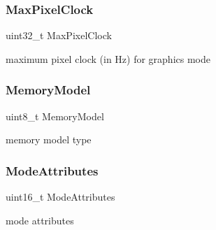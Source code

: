 \hypertarget{structvbe__mode__info__t_ab1fbd72846963ebb34a308a7edf7bbe1}{}\label{structvbe__mode__info__t_ab1fbd72846963ebb34a308a7edf7bbe1} 
\subsubsection{\texorpdfstring{Max\+Pixel\+Clock}{MaxPixelClock}}
{\footnotesize\ttfamily uint32\+\_\+t Max\+Pixel\+Clock}



maximum pixel clock (in Hz) for graphics mode 

\hypertarget{structvbe__mode__info__t_ab9be703b2b515ba3428ed97af9bb084d}{}\label{structvbe__mode__info__t_ab9be703b2b515ba3428ed97af9bb084d} 
\subsubsection{\texorpdfstring{Memory\+Model}{MemoryModel}}
{\footnotesize\ttfamily uint8\+\_\+t Memory\+Model}



memory model type 

\hypertarget{structvbe__mode__info__t_ad7593abf9d201ce5e59de60baba548cd}{}\label{structvbe__mode__info__t_ad7593abf9d201ce5e59de60baba548cd} 
\subsubsection{\texorpdfstring{Mode\+Attributes}{ModeAttributes}}
{\footnotesize\ttfamily uint16\+\_\+t Mode\+Attributes}



mode attributes 

\hypertarget{structvbe__mode__info__t_aa955c03441b6d3e55b2ba4be4dae56a2}{}\label{structvbe__mode__info__t_aa955c03441b6d3e55b2ba4be4dae56a2} 
